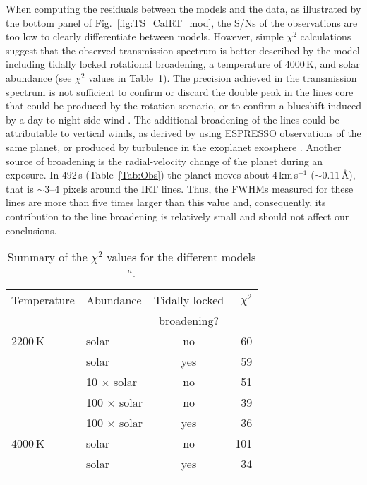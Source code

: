 \documentclass{aa}
\begin{document}
When computing the residuals between the models and the data, as illustrated by the bottom panel of Fig.~\ref{fig:TS_CaIRT_mod}, the S/Ns of the observations are too low to clearly differentiate between models. However, simple $\chi ^2$ calculations suggest that the observed transmission spectrum is better described by the model including tidally locked rotational broadening, a temperature of $4000$\,K, and solar abundance (see $\chi ^2$ values in Table~\ref{tab:chi2}).
The precision achieved in the transmission spectrum is not sufficient to confirm or discard the double peak in the lines core that could be produced by the rotation scenario, or to confirm a blueshift induced by a day-to-night side wind \citep{Ehrenreich2020}. The additional broadening of the lines could be attributable to vertical winds, as derived by \citet{Seidel2021} using ESPRESSO observations of the same planet, or produced by turbulence in the exoplanet exosphere \citep{Jager1954}. Another source of broadening is the radial-velocity change of the planet during an exposure. In $492$\,s (Table~\ref{Tab:Obs}) the planet moves about 4\,km\,s$^{-1}$ ($\sim 0.11$\,{\AA}), that is $\sim$3--4 pixels around the  IRT lines. Thus, the FWHMs measured for these lines are more than five times larger than this value and, consequently, its contribution to the line broadening is relatively small and should not affect our conclusions. 

\begin{table}[]
\centering
\caption{Summary of the $\chi ^2$ values for the different models$^{a}$.}
\begin{tabular}{llcr}
\hline
\hline
\noalign{\smallskip}
Temperature & Abundance & Tidally locked & $\chi ^{2}$\\

 & & broadening? & \\

\noalign{\smallskip}
\hline 
\noalign{\smallskip}

2200\,K  &  solar & no & 60\\
         &  solar & yes & 59\\
         &  10 $\times$ solar & no & 51\\
         &  100 $\times$ solar & no & 39\\
         &  100 $\times$ solar & yes & 36\\
4000\,K  &  solar & no & 101\\
         &  solar & yes & 34\\

\noalign{\smallskip}
\hline
\end{tabular}\\
\label{tab:chi2}
\end{table}
\end{document}
